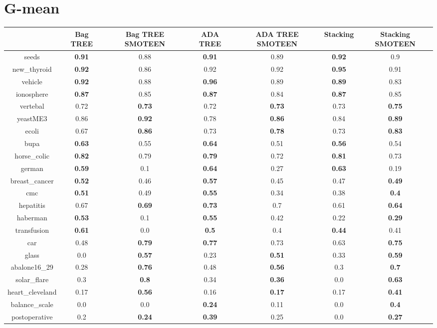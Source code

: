 \documentclass{article}%
\begin{document}
%
\section*{G{-}mean}%
\begin{tabular}{c|cccccc}%
&Bag TREE&Bag TREE SMOTEEN&ADA TREE&ADA TREE SMOTEEN&Stacking&Stacking SMOTEEN\\%
\hline%
seeds&\textbf{0.91}&0.88&\textbf{0.91}&0.89&\textbf{0.92}&0.9\\%
new\_thyroid&\textbf{0.92}&0.86&0.92&0.92&\textbf{0.95}&0.91\\%
vehicle&\textbf{0.92}&0.88&\textbf{0.96}&0.89&\textbf{0.89}&0.83\\%
ionosphere&\textbf{0.87}&0.85&\textbf{0.87}&0.84&\textbf{0.87}&0.85\\%
vertebal&0.72&\textbf{0.73}&0.72&\textbf{0.73}&0.73&\textbf{0.75}\\%
yeastME3&0.86&\textbf{0.92}&0.78&\textbf{0.86}&0.84&\textbf{0.89}\\%
ecoli&0.67&\textbf{0.86}&0.73&\textbf{0.78}&0.73&\textbf{0.83}\\%
bupa&\textbf{0.63}&0.55&\textbf{0.64}&0.51&\textbf{0.56}&0.54\\%
horse\_colic&\textbf{0.82}&0.79&\textbf{0.79}&0.72&\textbf{0.81}&0.73\\%
german&\textbf{0.59}&0.1&\textbf{0.64}&0.27&\textbf{0.63}&0.19\\%
breast\_cancer&\textbf{0.52}&0.46&\textbf{0.57}&0.45&0.47&\textbf{0.49}\\%
cmc&\textbf{0.51}&0.49&\textbf{0.55}&0.34&0.38&\textbf{0.4}\\%
hepatitis&0.67&\textbf{0.69}&\textbf{0.73}&0.7&0.61&\textbf{0.64}\\%
haberman&\textbf{0.53}&0.1&\textbf{0.55}&0.42&0.22&\textbf{0.29}\\%
transfusion&\textbf{0.61}&0.0&\textbf{0.5}&0.4&\textbf{0.44}&0.41\\%
car&0.48&\textbf{0.79}&\textbf{0.77}&0.73&0.63&\textbf{0.75}\\%
glass&0.0&\textbf{0.57}&0.23&\textbf{0.51}&0.33&\textbf{0.59}\\%
abalone16\_29&0.28&\textbf{0.76}&0.48&\textbf{0.56}&0.3&\textbf{0.7}\\%
solar\_flare&0.3&\textbf{0.8}&0.34&\textbf{0.36}&0.0&\textbf{0.63}\\%
heart\_cleveland&0.17&\textbf{0.56}&0.16&\textbf{0.17}&0.17&\textbf{0.41}\\%
balance\_scale&0.0&0.0&\textbf{0.24}&0.11&0.0&\textbf{0.4}\\%
postoperative&0.2&\textbf{0.24}&\textbf{0.39}&0.25&0.0&\textbf{0.27}\\%
\end{tabular}

%
\end{document}
